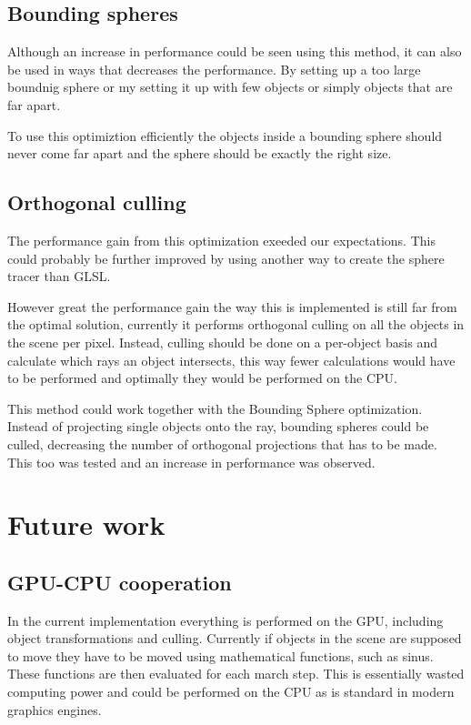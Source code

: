 
		\subsection{Bounding spheres}
			
			Although an increase in performance could be seen using this method,
			it can also be used in ways that decreases the performance. By
			setting up a too large boundnig sphere or my setting it up with few
			objects or simply objects that are far apart.

			To use this optimiztion efficiently the objects inside a bounding 
			sphere should never come far apart and the sphere should be exactly 
			the right size.

		\subsection{Orthogonal culling}

			The performance gain from this optimization exeeded our 
			expectations. This could probably be further improved by using
			another way to create the sphere tracer than GLSL. 

			However great the performance gain the way this is implemented
			is still far from the optimal solution, currently it performs orthogonal 
			culling on all the objects in the scene per pixel. Instead,
			culling should be done on a per-object basis and calculate
			which rays an object intersects, this way fewer calculations would
			have to be performed and optimally they would be performed on the
			CPU.

			This method could work together with the Bounding Sphere 
			optimization. Instead of projecting single objects onto the ray,
			bounding spheres could be culled, decreasing the number of 
			orthogonal projections that has to be made. This too was tested 
			and an increase in performance was observed.

	\section{Future work}

		\subsection{GPU-CPU cooperation}

			In the current implementation everything is performed on the GPU,
			including object transformations and culling. Currently if objects 
			in the scene are supposed to move they have to be moved using 
			mathematical functions, such as sinus. These functions are then evaluated for 
			each march step. This is essentially wasted computing power and
			could be performed on the CPU as is standard in modern graphics
			engines.



